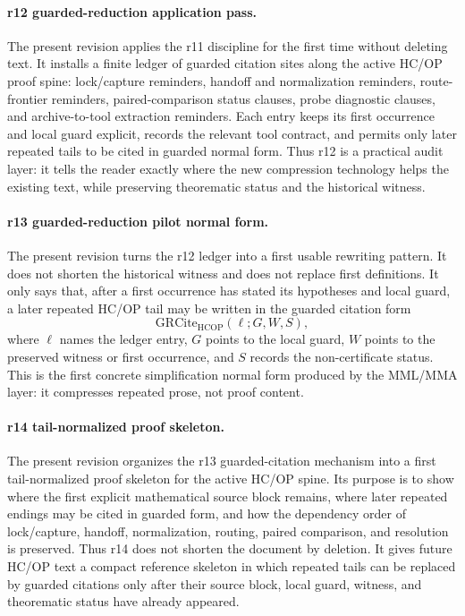 \paragraph{r12 guarded-reduction application pass.}
The present revision applies the r11 discipline for the first time without deleting text. It installs a finite ledger of guarded citation sites along the active HC/OP proof spine: lock/capture reminders, handoff and normalization reminders, route-frontier reminders, paired-comparison status clauses, probe diagnostic clauses, and archive-to-tool extraction reminders. Each entry keeps its first occurrence and local guard explicit, records the relevant tool contract, and permits only later repeated tails to be cited in guarded normal form. Thus r12 is a practical audit layer: it tells the reader exactly where the new compression technology helps the existing text, while preserving theorematic status and the historical witness.


\paragraph{r13 guarded-reduction pilot normal form.}
The present revision turns the r12 ledger into a first usable rewriting pattern. It does not shorten the historical witness and does not replace first definitions. It only says that, after a first occurrence has stated its hypotheses and local guard, a later repeated HC/OP tail may be written in the guarded citation form
\[
  \mathrm{GRCite}_{\mathrm{HCOP}}(\ell;G,W,S),
\]
where \(\ell\) names the ledger entry, \(G\) points to the local guard, \(W\) points to the preserved witness or first occurrence, and \(S\) records the non-certificate status. This is the first concrete simplification normal form produced by the MML/MMA layer: it compresses repeated prose, not proof content.

\paragraph{r14 tail-normalized proof skeleton.}
The present revision organizes the r13 guarded-citation mechanism into a first tail-normalized proof skeleton for the active HC/OP spine. Its purpose is to show where the first explicit mathematical source block remains, where later repeated endings may be cited in guarded form, and how the dependency order of lock/capture, handoff, normalization, routing, paired comparison, and resolution is preserved. Thus r14 does not shorten the document by deletion. It gives future HC/OP text a compact reference skeleton in which repeated tails can be replaced by guarded citations only after their source block, local guard, witness, and theorematic status have already appeared.
